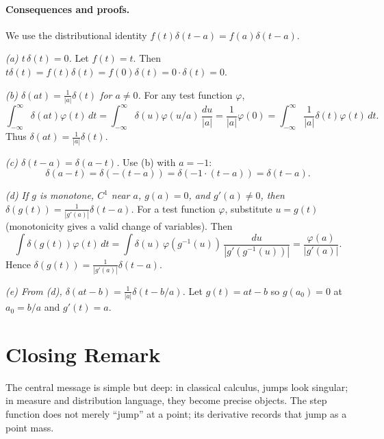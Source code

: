 \documentclass[12pt]{article}
\begin{document}
\paragraph{Consequences and proofs.}
We use the distributional identity $f(t)\delta(t-a)=f(a)\delta(t-a)$.

\textit{(a) $t\,\delta(t)=0$.}
Let $f(t)=t$. Then $t\delta(t)=f(t)\delta(t)=f(0)\delta(t)=0\cdot\delta(t)=0$.

\textit{(b) $\delta(a t)=\frac{1}{|a|}\delta(t)$ for $a\neq 0$.}
For any test function $\varphi$,
\[
 \int_{-\infty}^{\infty}\delta(a t)\varphi(t)\,dt
 =\int_{-\infty}^{\infty}\delta(u)\varphi(u/a)\,\frac{du}{|a|}
 =\frac{1}{|a|}\varphi(0)
 =\int_{-\infty}^{\infty}\frac{1}{|a|}\delta(t)\varphi(t)\,dt.
\]
Thus $\delta(a t)=\frac{1}{|a|}\delta(t)$.

\textit{(c) $\delta(t-a)=\delta(a-t)$.}
Use (b) with $a=-1$:
\[
\delta(a-t)=\delta(-(t-a))=\delta(-1\cdot(t-a))=\delta(t-a).
\]

\textit{(d) If $g$ is monotone, $C^1$ near $a$, $g(a)=0$, and $g'(a)\neq 0$, then
$\delta(g(t))=\frac{1}{|g'(a)|}\delta(t-a)$.}
For a test function $\varphi$, substitute $u=g(t)$ (monotonicity gives a valid change
of variables). Then
\[
 \int \delta(g(t))\varphi(t)\,dt
 =\int \delta(u)\,\varphi(g^{-1}(u))\,\frac{du}{|g'(g^{-1}(u))|}
 =\frac{\varphi(a)}{|g'(a)|}.
\]
Hence $\delta(g(t))=\frac{1}{|g'(a)|}\delta(t-a)$.

\textit{(e) From (d), $\delta(a t-b)=\frac{1}{|a|}\delta(t-b/a)$.}
Let $g(t)=a t-b$ so $g(a_0)=0$ at $a_0=b/a$ and $g'(t)=a$.

\section{Closing Remark}

The central message is simple but deep:
in classical calculus, jumps look singular; in measure and distribution language,
they become precise objects. The step function does not merely ``jump'' at a point;
its derivative records that jump as a point mass.



\end{document}
